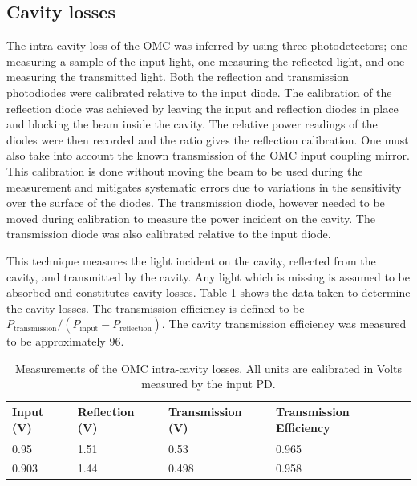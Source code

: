 \subsection{Cavity losses}
\label{sec:omclosses}
The intra-cavity loss of the OMC was inferred by using three photodetectors; one measuring a sample of the input light, one measuring the reflected light, and one measuring the transmitted light. %
Both the reflection and transmission photodiodes were calibrated relative to the input diode. %
The calibration of the reflection diode was achieved by leaving the input and reflection diodes in place and blocking the beam inside the cavity. %
The relative power readings of the diodes were then recorded and the ratio gives the reflection calibration. %
One must also take into account the known transmission of the OMC input coupling mirror. %
This calibration is done without moving the beam to be used during the measurement and mitigates systematic errors due to variations in the sensitivity over the surface of the diodes. %
The transmission diode, however needed to be moved during calibration to measure the power incident on the cavity. %
The transmission diode was also calibrated relative to the input diode.

This technique measures the light incident on the cavity, reflected from the cavity, and transmitted by the cavity. %
Any light which is missing is assumed to be absorbed and constitutes cavity losses. %
Table \ref{tab:lossmeas} shows the data taken to determine the cavity losses. %
The transmission efficiency is defined to be $P_{\text{transmission}}/(P_{\text{input}}-P_{\text{reflection}})$. %
The cavity transmission efficiency was measured to be approximately 96\perc{}.

\begin{table}
  \begin{center}
    \begin{tabular}{lll|l}
      \hline
      Input (V) & Reflection (V) & Transmission (V) & Transmission Efficiency \\
      \hline
      0.95 & 1.51 & 0.53 & 0.965 \\
      0.903 & 1.44 &0.498 & 0.958\\
      \hline
    \end{tabular}
  \caption[Measurements of the OMC intra-cavity losses.]{Measurements of the OMC intra-cavity losses. All units are calibrated in Volts measured by the input PD.}
  \label{tab:lossmeas}
  \end{center}
\end{table}

